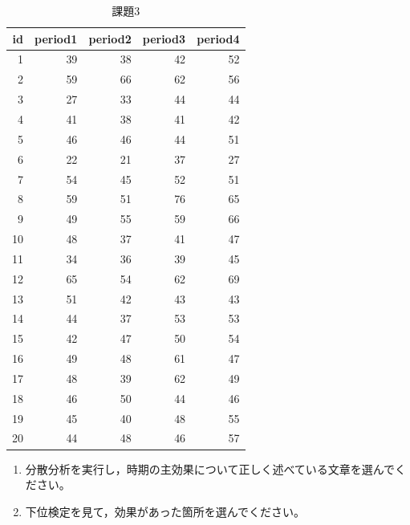 \documentclass{ltjbook}
\begin{document}
\begin{table}[ht]
	\centering
	\caption{課題3}
	\begin{tabular}{r|rrrr}
		\hline
		id & period1 & period2 & period3 & period4 \\
		\hline
		1  & 39      & 38      & 42      & 52      \\
		2  & 59      & 66      & 62      & 56      \\
		3  & 27      & 33      & 44      & 44      \\
		4  & 41      & 38      & 41      & 42      \\
		5  & 46      & 46      & 44      & 51      \\
		6  & 22      & 21      & 37      & 27      \\
		7  & 54      & 45      & 52      & 51      \\
		8  & 59      & 51      & 76      & 65      \\
		9  & 49      & 55      & 59      & 66      \\
		10 & 48      & 37      & 41      & 47      \\
		11 & 34      & 36      & 39      & 45      \\
		12 & 65      & 54      & 62      & 69      \\
		13 & 51      & 42      & 43      & 43      \\
		14 & 44      & 37      & 53      & 53      \\
		15 & 42      & 47      & 50      & 54      \\
		16 & 49      & 48      & 61      & 47      \\
		17 & 48      & 39      & 62      & 49      \\
		18 & 46      & 50      & 44      & 46      \\
		19 & 45      & 40      & 48      & 55      \\
		20 & 44      & 48      & 46      & 57      \\
		\hline
	\end{tabular}
	\label{L23::exe3}
\end{table}

\begin{enumerate}
	\item 分散分析を実行し，時期の主効果について正しく述べている文章を選んでください。
	\item 下位検定を見て，効果があった箇所を選んでください。
\end{enumerate}
\end{document}
